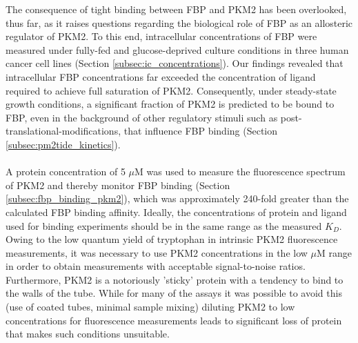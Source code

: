 The consequence of tight binding between FBP and PKM2 has been overlooked, thus far, as it raises questions regarding the biological role of FBP as an allosteric regulator of PKM2. To this end, intracellular concentrations of FBP were measured under fully-fed and glucose-deprived culture conditions in three human cancer cell lines (Section \ref{subsec:ic_concentrations}). Our findings revealed that intracellular FBP concentrations far exceeded the concentration of ligand required to achieve full saturation of PKM2. Consequently, under steady-state growth conditions, a significant fraction of PKM2 is predicted to be bound to FBP, even in the background of other regulatory stimuli such as post-translational-modifications, that influence FBP binding \cite{Christofk:2008aa,Hitosugi:2009aa} (Section \ref{subsec:pm2tide_kinetics}). 
%
%
\\\\
%
%
A protein concentration of 5 $\mu$M was used to measure the fluorescence spectrum of PKM2 and thereby monitor FBP binding (Section \ref{subsec:fbp_binding_pkm2}), which was approximately 240-fold greater than the calculated FBP binding affinity. Ideally, the concentrations of protein and ligand used for binding experiments should be in the same range as the measured $K_D$. Owing to the low quantum yield of tryptophan in intrinsic PKM2 fluorescence measurements, it was necessary to use PKM2 concentrations in the low $\mu$M range in order to obtain measurements with acceptable signal-to-noise ratios. Furthermore, PKM2 is a notoriously 'sticky' protein with a tendency to bind to the walls of the tube. While for many of the assays it was possible to avoid this (use of coated tubes, minimal sample mixing) diluting PKM2 to low concentrations for fluorescence measurements leads to significant loss of protein that makes such conditions unsuitable. 
%
%
\\\\
%
%
